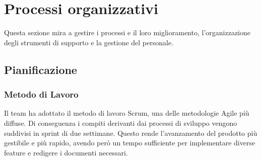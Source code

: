 \section{Processi organizzativi}
Questa sezione mira a gestire i processi e il loro miglioramento,
l'organizzazione degli strumenti di supporto e la gestione del personale.

\subsection{Pianificazione}
\subsubsection{Metodo di Lavoro}
Il team ha adottato il metodo di lavoro Scrum, una delle metodologie Agile più
diffuse. Di conseguenza i compiti derivanti dai processi di sviluppo vengono
suddivisi in sprint di due settimane. Questo rende l'avanzamento del prodotto
più gestibile e più rapido, avendo però un tempo sufficiente per implementare
diverse feature e redigere i documenti necessari.
